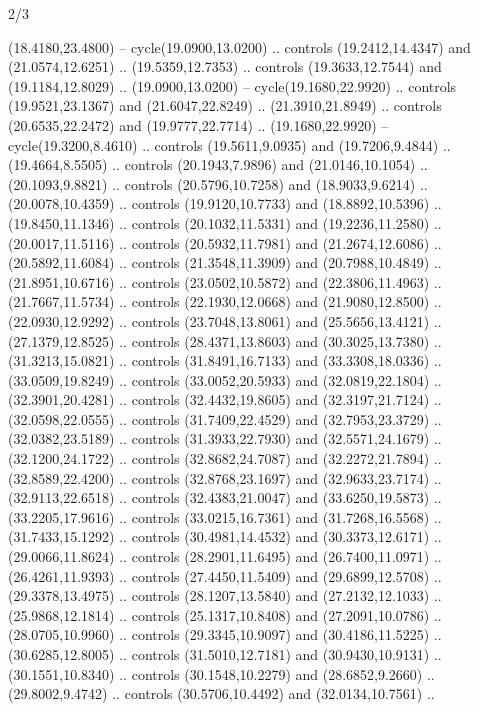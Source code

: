 \begin{flagdescription}{2/3}
\begin{scope}[yshift=\flagwidth,scale=\flagwidth/1241.93737]
\begin{scope}[y=-1mm, x=1mm,draw=gold,fill=blue,line join=miter,miter limit=4,line width=1.8\lw]
\begin{scope}[y=1mm, x=1mm, yscale=-1,shift={(573.68mm+\str,145.75)}]
\begin{scope}[scale=1.35,shift={(-9,-3)}]
\begin{scope}[scale=0.55]
\begin{scope}[scale=1.333]
    (18.4180,23.4800) -- cycle(19.0900,13.0200) .. controls (19.2412,14.4347) and
    (21.0574,12.6251) .. (19.5359,12.7353) .. controls (19.3633,12.7544) and
    (19.1184,12.8029) .. (19.0900,13.0200) -- cycle(19.1680,22.9920) .. controls
    (19.9521,23.1367) and (21.6047,22.8249) .. (21.3910,21.8949) .. controls
    (20.6535,22.2472) and (19.9777,22.7714) .. (19.1680,22.9920) --
    cycle(19.3200,8.4610) .. controls (19.5611,9.0935) and (19.7206,9.4844) ..
    (19.4664,8.5505) .. controls (20.1943,7.9896) and (21.0146,10.1054) ..
    (20.1093,9.8821) .. controls (20.5796,10.7258) and (18.9033,9.6214) ..
    (20.0078,10.4359) .. controls (19.9120,10.7733) and (18.8892,10.5396) ..
    (19.8450,11.1346) .. controls (20.1032,11.5331) and (19.2236,11.2580) ..
    (20.0017,11.5116) .. controls (20.5932,11.7981) and (21.2674,12.6086) ..
    (20.5892,11.6084) .. controls (21.3548,11.3909) and (20.7988,10.4849) ..
    (21.8951,10.6716) .. controls (23.0502,10.5872) and (22.3806,11.4963) ..
    (21.7667,11.5734) .. controls (22.1930,12.0668) and (21.9080,12.8500) ..
    (22.0930,12.9292) .. controls (23.7048,13.8061) and (25.5656,13.4121) ..
    (27.1379,12.8525) .. controls (28.4371,13.8603) and (30.3025,13.7380) ..
    (31.3213,15.0821) .. controls (31.8491,16.7133) and (33.3308,18.0336) ..
    (33.0509,19.8249) .. controls (33.0052,20.5933) and (32.0819,22.1804) ..
    (32.3901,20.4281) .. controls (32.4432,19.8605) and (32.3197,21.7124) ..
    (32.0598,22.0555) .. controls (31.7409,22.4529) and (32.7953,23.3729) ..
    (32.0382,23.5189) .. controls (31.3933,22.7930) and (32.5571,24.1679) ..
    (32.1200,24.1722) .. controls (32.8682,24.7087) and (32.2272,21.7894) ..
    (32.8589,22.4200) .. controls (32.8768,23.1697) and (32.9633,23.7174) ..
    (32.9113,22.6518) .. controls (32.4383,21.0047) and (33.6250,19.5873) ..
    (33.2205,17.9616) .. controls (33.0215,16.7361) and (31.7268,16.5568) ..
    (31.7433,15.1292) .. controls (30.4981,14.4532) and (30.3373,12.6171) ..
    (29.0066,11.8624) .. controls (28.2901,11.6495) and (26.7400,11.0971) ..
    (26.4261,11.9393) .. controls (27.4450,11.5409) and (29.6899,12.5708) ..
    (29.3378,13.4975) .. controls (28.1207,13.5840) and (27.2132,12.1033) ..
    (25.9868,12.1814) .. controls (25.1317,10.8408) and (27.2091,10.0786) ..
    (28.0705,10.9960) .. controls (29.3345,10.9097) and (30.4186,11.5225) ..
    (30.6285,12.8005) .. controls (31.5010,12.7181) and (30.9430,10.9131) ..
    (30.1551,10.8340) .. controls (30.1548,10.2279) and (28.6852,9.2660) ..
    (29.8002,9.4742) .. controls (30.5706,10.4492) and (32.0134,10.7561) ..

\end{scope}
\end{scope}
\end{scope}
\end{scope}
\end{scope}
\end{scope}
\end{flagdescription}
